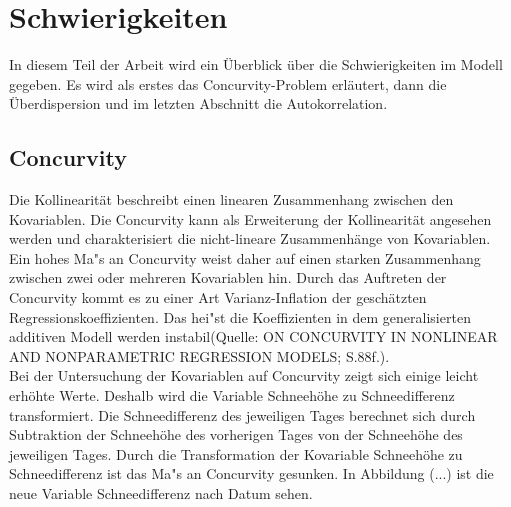 \section{Schwierigkeiten}
In diesem Teil der Arbeit wird ein Überblick über die Schwierigkeiten im Modell gegeben. Es wird als erstes das Concurvity-Problem erläutert, dann die Überdispersion und im letzten Abschnitt die Autokorrelation.

\subsection{Concurvity}
Die Kollinearität beschreibt einen linearen Zusammenhang zwischen den Kovariablen. Die Concurvity kann als Erweiterung der Kollinearität angesehen werden und charakterisiert die nicht-lineare Zusammenhänge von Kovariablen. Ein hohes Ma"s an Concurvity weist daher auf einen starken Zusammenhang zwischen zwei oder mehreren Kovariablen hin. Durch das Auftreten der Concurvity kommt es zu einer Art Varianz-Inflation der geschätzten Regressionskoeffizienten. Das hei"st die Koeffizienten in dem generalisierten additiven Modell werden instabil(Quelle: ON CONCURVITY IN NONLINEAR AND NONPARAMETRIC REGRESSION MODELS; S.88f.). \\
Bei der Untersuchung der Kovariablen auf Concurvity zeigt sich einige leicht erhöhte Werte. Deshalb wird die Variable Schneehöhe zu Schneedifferenz transformiert. Die Schneedifferenz des jeweiligen Tages berechnet sich durch Subtraktion der Schneehöhe des vorherigen Tages von der Schneehöhe des jeweiligen Tages. Durch die Transformation der Kovariable Schneehöhe zu Schneedifferenz ist das Ma"s an Concurvity gesunken. In Abbildung (...) ist die neue Variable Schneedifferenz nach Datum sehen.


